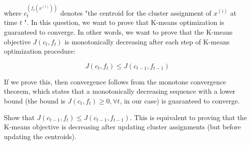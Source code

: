 \documentclass[10pt, a4paper]{article}
\begin{document}
where $c_{t}^{\left(f_{t}\left(x^{(i)}\right)\right)}$ denotes "the centroid for the cluster assignment of $x^{(i)}$ at time $t$ ". In this question, we want to prove that K-means optimization is guaranteed to converge. In other words, we want to prove that the K-means objective $J\left(c_{t}, f_{t}\right)$ is monotonically decreasing after each step of K-means optimization procedure:

$$
J\left(c_{t}, f_{t}\right) \leq J\left(c_{t-1}, f_{t-1}\right)
$$

If we prove this, then convergence follows from the monotone convergence theorem, which states that a monotonically decreasing sequence with a lower bound (the bound is $J\left(c_{t}, f_{t}\right) \geq 0, \forall t$, in our case) is guaranteed to converge.

\begin{Problem*}[(a) (5 pts)]
 Show that $J\left(c_{t-1}, f_{t}\right) \leq J\left(c_{t-1}, f_{t-1}\right)$. This is equivalent to proving that the K-means objective is decreasing after updating cluster assignments (but before updating the centroids).
\end{Problem*}
\end{document}
